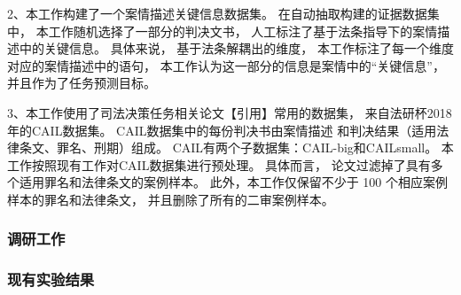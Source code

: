 2、本工作构建了一个案情描述关键信息数据集。
在自动抽取构建的证据数据集中，
本工作随机选择了一部分的判决文书，
人工标注了基于法条指导下的案情描述中的关键信息。
具体来说，
基于法条解耦出的维度，
本工作标注了每一个维度对应的案情描述中的语句，
本工作认为这一部分的信息是案情中的“关键信息”，
并且作为了任务预测目标。

3、本工作使用了司法决策任务相关论文【引用】常用的数据集，
来自法研杯2018年的CAIL数据集。
CAIL数据集中的每份判决书由案情描述
和判决结果（适用法律条文、罪名、刑期）组成。
CAIL有两个子数据集：CAIL-big和CAILsmall。
本工作按照现有工作对CAIL数据集进行预处理。
具体而言，
论文过滤掉了具有多个适用罪名和法律条文的案例样本。
此外，本工作仅保留不少于 100 个相应案例样本的罪名和法律条文，
并且删除了所有的二审案例样本。

\subsubsection{调研工作}


\subsubsection{现有实验结果}


